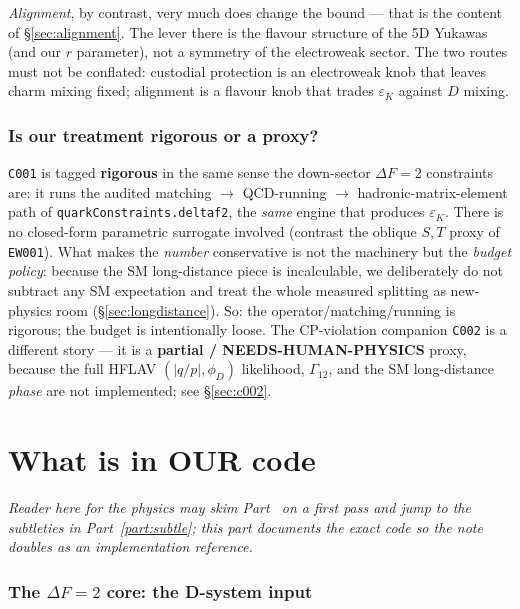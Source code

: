 \documentclass[11pt]{article}
\newcommand{\eps}{\varepsilon}
\newcommand{\code}[1]{\texttt{#1}}
\theoremstyle{definition}
\begin{document}
\emph{Alignment}, by contrast, very much does change the bound --- that is the
content of \S\ref{sec:alignment}. The lever there is the flavour structure of
the 5D Yukawas (and our $r$ parameter), not a symmetry of the electroweak
sector. The two routes must not be conflated: custodial protection is an
electroweak knob that leaves charm mixing fixed; alignment is a flavour knob
that trades $\eps_K$ against $D$ mixing.

\section{Is our treatment rigorous or a proxy?}
\label{sec:rigor}

\code{C001} is tagged \textbf{rigorous} in the same sense the down-sector
$\Delta F=2$ constraints are: it runs the audited matching $\to$ QCD-running
$\to$ hadronic-matrix-element path of \code{quarkConstraints.deltaf2}, the
\emph{same} engine that produces $\eps_K$. There is no closed-form parametric
surrogate involved (contrast the oblique $S,T$ proxy of \code{EW001}). What
makes the \emph{number} conservative is not the machinery but the \emph{budget
policy}: because the SM long-distance piece is incalculable, we deliberately do
not subtract any SM expectation and treat the whole measured splitting as
new-physics room (\S\ref{sec:longdistance}). So: the operator/matching/running
is rigorous; the budget is intentionally loose. The CP-violation companion
\code{C002} is a different story --- it is a \textbf{partial / NEEDS-HUMAN-PHYSICS}
proxy, because the full HFLAV $(|q/p|,\phi_D)$ likelihood, $\Gamma_{12}$, and the
SM long-distance \emph{phase} are not implemented; see \S\ref{sec:c002}.

\part{What is in OUR code}
\label{part:code}

\emph{Reader here for the physics may skim Part~\ref{part:code} on a first pass
and jump to the subtleties in Part~\ref{part:subtle}; this part documents the
exact code so the note doubles as an implementation reference.}

\section{The $\Delta F=2$ core: the D-system input}
\label{sec:core}
\end{document}
